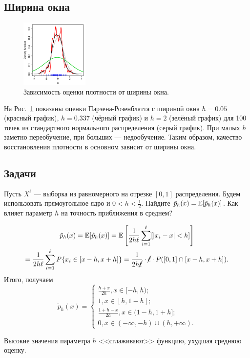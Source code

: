 \subsection*{Ширина окна}
\begin{figure}
\includegraphics[width=0.3\textwidth]{kde_bandwidth.png}
\caption{Зависимость оценки плотности от ширины окна.}\label{kde:bandwidth}
\end{figure}

На Рис.~\ref{kde:bandwidth} показаны оценки Парзена-Розенблатта с шириной окна
$h=0.05$ (красный график), $h=0.337$ (чёрный график) и $h=2$ (зелёный график)
для 100 точек из стандартного нормального распределения (серый график). При
малых $h$ заметно переобучение, при больших --- недообучение. Таким образом,
качество восстановления плотности в основном зависит от ширины окна.

\newpage
\subsection*{Задачи}

\begin{task}
Пусть $X^\ell$ --- выборка из равномерного на отрезке $[0,1]$ распределения.
Будем использовать прямоугольное ядро и $0 < h < \frac{1}{2}$. Найдите
$\tilde{p}_h(x) = \mathbb{E}[\hat{p}_h(x)]$. Как влияет параметр $h$ на точность
приближения в среднем?
\end{task}

\begin{solution}
\begin{multline*}
\tilde{p}_h(x) = \mathbb{E}[\hat{p}_h(x)]
  = \mathbb{E}\left[\frac{1}{2h\ell}\sum_{i = 1}^\ell [|x_i - x| < h]\right]\\
  = \frac{1}{2h\ell}\sum_{i = 1}^\ell P\{x_i \in [x - h, x + h]\}
  = \frac{1}{2h \cancel{\ell}} \cdot \cancel{\ell} \cdot P([0, 1] \cap [x - h, x + h]).
\end{multline*}
Итого, получаем
\begin{equation*}
\tilde{p}_h(x) =
\begin{cases}
\frac{h + x}{2h}, x \in [-h, h);\\
1, x \in [h, 1 - h];\\
\frac{1 + h - x}{2h}, x \in (1 - h, 1 + h];\\
0, x \in (-\infty, -h) \cup (h, +\infty).
\end{cases}
\end{equation*}

Высокие значения параметра $h$ <<сглаживают>> функцию, ухудшая среднюю оценку.
\end{solution}

